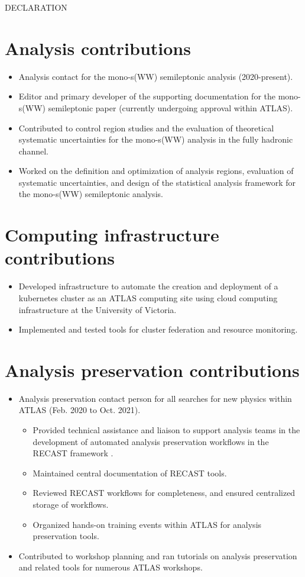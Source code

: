 \begin{center}
DECLARATION
\end{center}

\section*{Analysis contributions}

\begin{itemize}
\item Analysis contact for the mono-s(WW) semileptonic analysis (2020-present).
\item Editor and primary developer of the supporting documentation for the mono-s(WW) semileptonic paper (currently undergoing approval within ATLAS).
\item Contributed to control region studies and the evaluation of theoretical systematic uncertainties for the mono-s(WW) analysis in the fully hadronic channel.
\item Worked on the definition and optimization of analysis regions, evaluation of systematic uncertainties, and design of the statistical analysis framework for the mono-s(WW) semileptonic analysis.
\end{itemize}

\section*{Computing infrastructure contributions}
\begin{itemize}
\item Developed infrastructure to automate the creation and deployment of a kubernetes cluster as an ATLAS computing site using cloud computing infrastructure at the University of Victoria.
\item Implemented and tested tools for cluster federation and resource monitoring. 
\end{itemize}

\section*{Analysis preservation contributions}
\begin{itemize}
\item Analysis preservation contact person for all searches for new physics within ATLAS (Feb. 2020 to Oct. 2021).
\begin{itemize}
\item Provided technical assistance and liaison to support analysis teams in the development of automated analysis preservation workflows in the RECAST framework \cite{Cranmer2011}.
\item Maintained central documentation of RECAST tools.
\item Reviewed RECAST workflows for completeness, and ensured centralized storage of workflows.
\item Organized hands-on training events within ATLAS for analysis preservation tools.
\end{itemize}
\item Contributed to workshop planning and ran tutorials on analysis preservation and related tools for numerous ATLAS workshops.
\end{itemize}